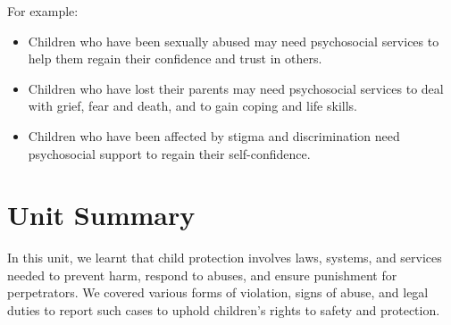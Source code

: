 \documentclass[12pt,a4paper]{article}
\begin{document}
For example:
\begin{itemize}
    \item Children who have been sexually abused may need psychosocial services to help them regain their confidence and trust in others.
    \item Children who have lost their parents may need psychosocial services to deal with grief, fear and death, and to gain coping and life skills.
    \item Children who have been affected by stigma and discrimination need psychosocial support to regain their self-confidence.
\end{itemize}

\section*{Unit Summary}
In this unit, we learnt that child protection involves laws, systems, and services needed to prevent harm, respond to abuses, and ensure punishment for perpetrators. We covered various forms of violation, signs of abuse, and legal duties to report such cases to uphold children's rights to safety and protection.
\end{document}
